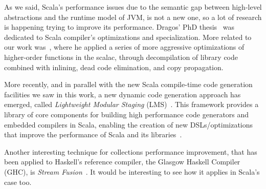 \label{related}
As we said, Scala's performance issues due to the semantic gap between high-level abstractions and the runtime model of JVM, is not a new one, so a lot of research is happening trying to improve its performance. Dragos' PhD thesis~\cite{dragos2010compiling} was dedicated to Scala compiler's optimizations and specialization. More related to our work was~\cite{dragos2008optimizing}, where he applied a series of more aggressive optimizations of higher-order functions in the scalac, through decompilation of library code combined with inlining, dead code elimination, and copy propagation.

More recently, and in parallel with the new Scala compile-time code generation facilities we saw in this work, a new dynamic code generation approach has emerged, called \emph{Lightweight Modular Staging} (LMS)~\cite{rompf2010lightweight,rompf2011building}. This framework provides a library of core components for building high performance code generators and embedded compilers in Scala, enabling the creation of new DSLs/optimizations that improve the performance of Scala and its libraries~\cite{moors2012scala,brown2011heterogeneous,ureche2012stagedsac,rompf2013optimizing}.

Another interesting technique for collections performance improvement, that has been applied to Haskell's reference compiler, the Glasgow Haskell Compiler (GHC), is \emph{Stream Fusion}~\cite{coutts2007stream,mainlandhaskell}. It would be interesting to see how it applies in Scala's case too.
